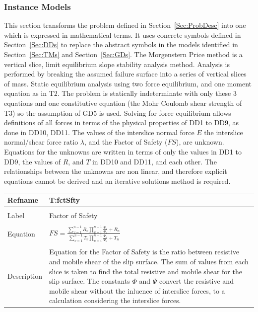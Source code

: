 \documentclass[12pt]{article}
\begin{document}
\subsubsection{Instance Models}
\label{Sec:IMs}
This section transforms the problem defined in Section~\ref{Sec:ProbDesc} into one which is expressed in mathematical terms. It uses concrete symbols defined in Section~\ref{Sec:DDs} to replace the abstract symbols in the models identified in Section~\ref{Sec:TMs} and Section~\ref{Sec:GDs}.
The Morgenstern Price method is a vertical slice, limit equilibrium slope stability analysis method. Analysis is performed by breaking the assumed failure surface into a series of vertical slices of mass. Static equilibrium analysis using two force equilibrium, and one moment equation as in T2. The problem is statically indeterminate with only these 3 equations and one constitutive equation (the Mohr Coulomb shear strength of T3) so the assumption of GD5 is used. Solving for force equilibrium allows definitions of all forces in terms of the physical properties of DD1 to DD9, as done in DD10, DD11.
The values of the interslice normal force $E$ the interslice normal/shear force ratio $\lambda{}$, and the Factor of Safety ($FS$), are unknown. Equations for the unknowns are written in terms of only the values in DD1 to DD9, the values of $R$, and $T$ in DD10 and DD11, and each other. The relationships between the unknowns are non linear, and therefore explicit equations cannot be derived and an iterative solutions method is required.
~\newline
\noindent \begin{minipage}{\textwidth}
\begin{tabular}{p{} p{}}
\toprule \textbf{Refname} & \textbf{T:fctSfty}
\label{T:fctSfty}
\\ \midrule \\
Label & Factor of Safety
\\ \midrule \\
Equation & $FS=\frac{\displaystyle\sum_{v=1}^{n-1}{R_{v} \displaystyle\prod_{u=i}^{n-1}{\frac{\Psi{}_{u}}{\Phi{}_{u}}}}+R_{n}}{\displaystyle\sum_{v=1}^{n-1}{T_{v} \displaystyle\prod_{u=i}^{n-1}{\frac{\Psi{}_{u}}{\Phi{}_{u}}}}+T_{n}}$
\\ \midrule \\
Description & Equation for the Factor of Safety is the ratio between resistive and mobile shear of the slip surface. The sum of values from each slice is taken to find the total resistive and mobile shear for the slip surface. The constants $\Phi{}$ and $\Psi{}$ convert the resistive and mobile shear without the inluence of interslice forces, to a calculation considering the interslice forces.
\\ \bottomrule \end{tabular}
\end{minipage}\\
\end{document}
